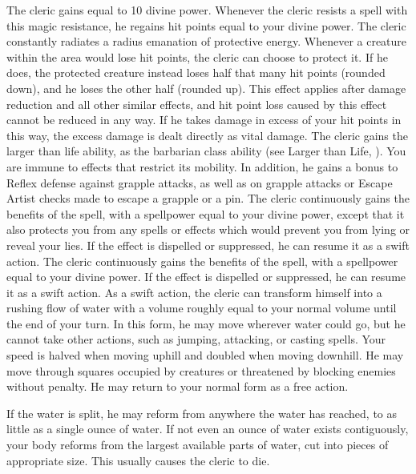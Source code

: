             The cleric gains  equal to 10 \add divine power.
            Whenever the cleric resists a spell with this magic resistance, he regains hit points equal to your divine power.
            The cleric constantly radiates a \areamed radius emanation of protective energy.
            Whenever a creature within the area would lose hit points, the cleric can choose to protect it.
            If he does, the protected creature instead loses half that many hit points (rounded down), and he loses the other half (rounded up).
            This effect applies after damage reduction and all other similar effects, and hit point loss caused by this effect cannot be reduced in any way.
            If he takes damage in excess of your hit points in this way, the excess damage is dealt directly as vital damage.
            The cleric gains the larger than life ability, as the barbarian class ability (see Larger than Life, ).
            You are immune to effects that restrict its mobility. In addition, he gains a  bonus to Reflex defense against grapple attacks, as well as on grapple attacks or Escape Artist checks made to escape a grapple or a pin.
             The cleric continuously gains the benefits of the 
            spell, with a spellpower equal to your divine power, except that it also protects you from any spells or effects which would prevent you from lying or reveal your lies.
            If the effect is dispelled or suppressed, he can resume it as a swift action.
             The cleric continuously gains the benefits of the 
            spell, with a spellpower equal to your divine power.
            If the effect is dispelled or suppressed, he can resume it as a swift action.
            As a swift action, the cleric can transform himself into a rushing flow of water with a volume roughly equal to your normal volume until the end of your turn.
            In this form, he may move wherever water could go, but he cannot take other actions, such as jumping, attacking, or casting spells.
            Your speed is halved when moving uphill and doubled when moving downhill.
            He may move through squares occupied by creatures or threatened by blocking enemies without penalty.
            He may return to your normal form as a free action.
            \par If the water is split, he may reform from anywhere the water has reached, to as little as a single ounce of water.
            If not even an ounce of water exists contiguously, your body reforms from the largest available parts of water, cut into pieces of appropriate size.
            This usually causes the cleric to die.

